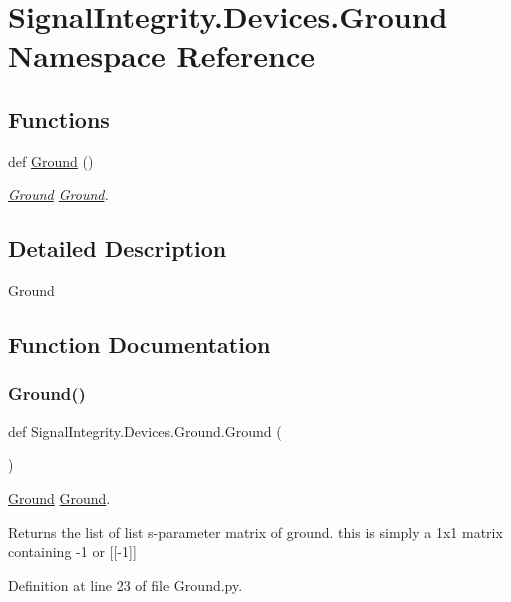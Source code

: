 \hypertarget{namespaceSignalIntegrity_1_1Devices_1_1Ground}{}\section{Signal\+Integrity.\+Devices.\+Ground Namespace Reference}
\label{namespaceSignalIntegrity_1_1Devices_1_1Ground}
\subsection*{Functions}
\begin{DoxyCompactItemize}
\item 
def \hyperlink{namespaceSignalIntegrity_1_1Devices_1_1Ground_a5533ec1a1b50e087bfe9027969ef1919}{Ground} ()
\begin{DoxyCompactList}\small\item\em \hyperlink{namespaceSignalIntegrity_1_1Devices_1_1Ground}{Ground} \hyperlink{namespaceSignalIntegrity_1_1Devices_1_1Ground}{Ground}. \end{DoxyCompactList}\end{DoxyCompactItemize}


\subsection{Detailed Description}
\begin{DoxyVerb}Ground\end{DoxyVerb}
 

\subsection{Function Documentation}
\mbox{\label{namespaceSignalIntegrity_1_1Devices_1_1Ground_a5533ec1a1b50e087bfe9027969ef1919}} 
\subsubsection{\texorpdfstring{Ground()}{Ground()}}
{\footnotesize\ttfamily def Signal\+Integrity.\+Devices.\+Ground.\+Ground (\begin{DoxyParamCaption}{ }\end{DoxyParamCaption})}



\hyperlink{namespaceSignalIntegrity_1_1Devices_1_1Ground}{Ground} \hyperlink{namespaceSignalIntegrity_1_1Devices_1_1Ground}{Ground}. 

\begin{DoxyReturn}{Returns}
the list of list s-\/parameter matrix of ground. this is simply a 1x1 matrix containing -\/1 or \mbox{[}\mbox{[}-\/1\mbox{]}\mbox{]} 
\end{DoxyReturn}


Definition at line 23 of file Ground.\+py.


